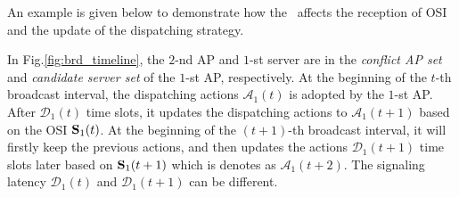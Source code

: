 
An example is given below to demonstrate how the \brlatency~affects the reception of OSI and the update of the dispatching strategy.

\begin{example}
    In Fig.\ref{fig:brd_timeline}, the $2$-nd AP and $1$-st server are in the \emph{conflict AP set} and \emph{candidate server set} of the $1$-st AP, respectively.
    At the beginning of the $t$-th broadcast interval, the dispatching actions $\mathcal{A}_{1}(t)$ is adopted by the $1$-st AP.
    After $\mathcal{D}_{1}(t)$ time slots, it updates the dispatching actions to $\mathcal{A}_{1}(t+1)$ based on the OSI $\mathbf{S}_{1}(t)$.
    At the beginning of the $(t+1)$-th broadcast interval, it will firstly keep the previous actions, and then updates the actions $\mathcal{D}_{1}(t+1)$ time slots later based on $\mathbf{S}_{1}(t+1)$ which is denotes as $\mathcal{A}_{1}(t+2)$.
    The signaling latency $\mathcal{D}_1(t)$ and $\mathcal{D}_1(t+1)$ can be different.
\end{example}
